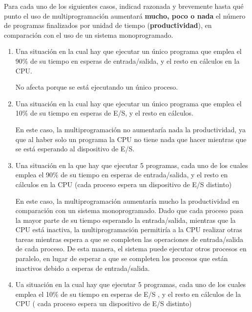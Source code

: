 \begin{ejercicio}
    Para cada uno de los siguientes casos, indicad razonada y brevemente hasta qué punto el uso de multiprogramación aumentará \textbf{mucho, poco o nada} el número de programas finalizados por unidad de tiempo (\textbf{productividad}), en comparación con el uso de un sistema monoprogramado.

\begin{enumerate}
    \item Una situación en la cual hay que ejecutar un único programa que emplea el 90\% de su tiempo en esperas de entrada/salida, y el resto en cálculos en la CPU.
    
    No afecta porque se está ejecutando un único proceso.
    
    \item Una situación en la cual hay que ejecutar un único programa que emplea el 10\% de su tiempo en esperas de E/S, y el resto en cálculos.

    En este caso, la multiprogramación no aumentaría nada la productividad, ya que al haber solo un programa la CPU no tiene nada que hacer mientras que se está esperando al dispositivo de E/S.
    
    \item Una situación en la que hay que ejecutar 5 programas, cada uno de los cuales emplea el 90\% de su tiempo en esperas de entrada/salida, y el resto en cálculos en la CPU (cada proceso espera un dispositivo de E/S distinto) 
    
    En este caso, la multiprogramación aumentaría mucho la productividad en comparación con un sistema monoprogramado. Dado que cada proceso pasa la mayor parte de su tiempo esperando la entrada/salida, mientras que la CPU está inactiva, la multiprogramación permitiría a la CPU realizar otras tareas mientras espera a que se completen las operaciones de entrada/salida de cada proceso. De esta manera, el sistema puede ejecutar otros procesos en paralelo, en lugar de esperar a que se completen los procesos que están inactivos debido a esperas de entrada/salida.
    
    \item Ua situación en la cual hay que ejecutar 5 programas, cada uno de los cuales emplea el 10\% de su tiempo en esperas de E/S , y el resto en cálculos de la CPU ( cada proceso espera un dispositivo de E/S distinto) 
    

\end{enumerate}
\end{ejercicio}
